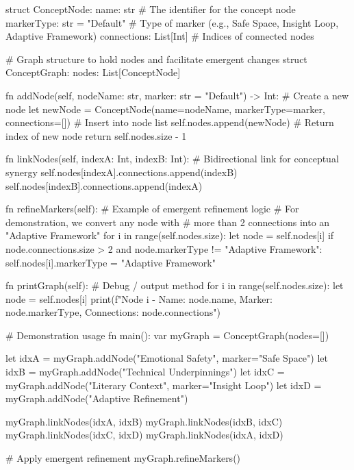 {    struct ConceptNode:
        name: str                    # The identifier for the concept node
        markerType: str = "Default"  # Type of marker (e.g., Safe Space, Insight Loop, Adaptive Framework)
        connections: List[Int]       # Indices of connected nodes

    # Graph structure to hold nodes and facilitate emergent changes
    struct ConceptGraph:
        nodes: List[ConceptNode]

        fn addNode(self, nodeName: str, marker: str = "Default") -> Int:
            # Create a new node
            let newNode = ConceptNode(name=nodeName, markerType=marker, connections=[])
            # Insert into node list
            self.nodes.append(newNode)
            # Return index of new node
            return self.nodes.size - 1

        fn linkNodes(self, indexA: Int, indexB: Int):
            # Bidirectional link for conceptual synergy
            self.nodes[indexA].connections.append(indexB)
            self.nodes[indexB].connections.append(indexA)

        fn refineMarkers(self):
            # Example of emergent refinement logic
            # For demonstration, we convert any node with
            # more than 2 connections into an "Adaptive Framework"
            for i in range(self.nodes.size):
                let node = self.nodes[i]
                if node.connections.size > 2 and node.markerType != "Adaptive Framework":
                    self.nodes[i].markerType = "Adaptive Framework"

        fn printGraph(self):
            # Debug / output method
            for i in range(self.nodes.size):
                let node = self.nodes[i]
                print(f"Node {i} - Name: {node.name}, Marker: {node.markerType}, Connections: {node.connections}")

    # Demonstration usage
    fn main():
        var myGraph = ConceptGraph(nodes=[])

        let idxA = myGraph.addNode("Emotional Safety", marker="Safe Space")
        let idxB = myGraph.addNode("Technical Underpinnings")
        let idxC = myGraph.addNode("Literary Context", marker="Insight Loop")
        let idxD = myGraph.addNode("Adaptive Refinement")

        myGraph.linkNodes(idxA, idxB)
        myGraph.linkNodes(idxB, idxC)
        myGraph.linkNodes(idxC, idxD)
        myGraph.linkNodes(idxA, idxD)

        # Apply emergent refinement
        myGraph.refineMarkers()

}
